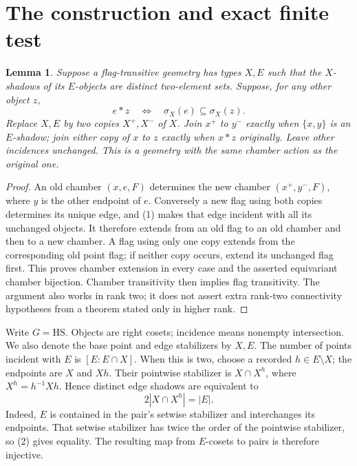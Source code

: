 \documentclass[11pt]{article}
\newtheorem{lemma}{Lemma}\newtheorem{theorem}{Theorem}
\begin{document}
\section{The construction and exact finite test}
\begin{lemma}
Suppose a flag-transitive geometry has types $X,E$ such that the
$X$-shadows of its $E$-objects are distinct two-element sets. Suppose, for
any other object $z$,
\[
 e*z\quad\Longleftrightarrow\quad \sigma_X(e)\subseteq\sigma_X(z). \tag{1}
\]
Replace $X,E$ by two copies $X^+,X^-$ of $X$. Join $x^+$ to $y^-$
exactly when $\{x,y\}$ is an $E$-shadow; join either copy of $x$ to
$z$ exactly when $x*z$ originally. Leave other incidences unchanged.
This is a geometry with the same chamber action as the original one.
\end{lemma}
\begin{proof}
An old chamber $(x,e,F)$ determines the new chamber $(x^+,y^-,F)$,
where $y$ is the other endpoint of $e$. Conversely a new flag using both
copies determines its unique edge, and (1) makes that edge incident with
all its unchanged objects. It therefore extends from an old flag to an
old chamber and then to a new chamber. A flag using only one copy extends
from the corresponding old point flag; if neither copy occurs, extend its
unchanged flag first. This proves chamber extension in every case and
the asserted equivariant chamber bijection. Chamber transitivity then
implies flag transitivity. The argument also works in rank two; it does
not assert extra rank-two connectivity hypotheses from a theorem stated
only in higher rank.
\end{proof}

Write $G=\mathrm{HS}$. Objects are right cosets; incidence means nonempty
intersection. We also denote the base point and edge stabilizers by
$X,E$. The number of points incident with $E$ is $[E:E\cap X]$.
When this is two, choose a recorded $h\in E\setminus X$; the endpoints
are $X$ and $Xh$. Their pointwise stabilizer is $X\cap X^h$, where
$X^h=h^{-1}Xh$. Hence distinct edge shadows are equivalent to
\[
                   2|X\cap X^h|=|E|.                    \tag{2}
\]
Indeed, $E$ is contained in the pair's setwise stabilizer and interchanges
its endpoints. That setwise stabilizer has twice the order of the
pointwise stabilizer, so (2) gives equality. The resulting map from
$E$-cosets to pairs is therefore injective.
\end{document}
